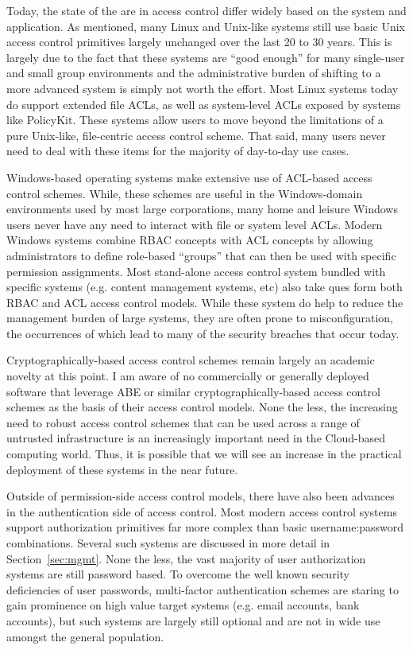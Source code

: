 \documentclass{sig-alternate}
\begin{document}
Today, the state of the are in access control differ widely based on
the system and application. As mentioned, many Linux and Unix-like
systems still use basic Unix access control primitives largely
unchanged over the last 20 to 30 years. This is largely due to the
fact that these systems are ``good enough'' for many single-user and
small group environments and the administrative burden of shifting to
a more advanced system is simply not worth the effort. Most Linux
systems today do support extended file ACLs, as well as system-level
ACLs exposed by systems like PolicyKit. These systems allow users to
move beyond the limitations of a pure Unix-like, file-centric access
control scheme. That said, many users never need to deal with these
items for the majority of day-to-day use cases.

Windows-based operating systems make extensive use of ACL-based access
control schemes. While, these schemes are useful in the Windows-domain
environments used by most large corporations, many home and leisure
Windows users never have any need to interact with file or system
level ACLs. Modern Windows systems combine RBAC concepts with ACL
concepts by allowing administrators to define role-based ``groups''
that can then be used with specific permission assignments. Most
stand-alone access control system bundled with specific systems
(e.g. content management systems, etc) also take ques form both RBAC
and ACL access control models. While these system do help to reduce
the management burden of large systems, they are often prone to
misconfiguration, the occurrences of which lead to many of the
security breaches that occur today.

Cryptographically-based access control schemes remain largely an
academic novelty at this point. I am aware of no commercially or
generally deployed software that leverage ABE or similar
cryptographically-based access control schemes as the basis of their
access control models. None the less, the increasing need to robust
access control schemes that can be used across a range of untrusted
infrastructure is an increasingly important need in the Cloud-based
computing world. Thus, it is possible that we will see an increase in
the practical deployment of these systems in the near future.

Outside of permission-side access control models, there have also been
advances in the authentication side of access control. Most modern
access control systems support authorization primitives far more
complex than basic username:password combinations. Several such
systems are discussed in more detail in Section~\ref{sec:mgmt}. None
the less, the vast majority of user authorization systems are still
password based. To overcome the well known security deficiencies of
user passwords, multi-factor authentication schemes are staring to
gain prominence on high value target systems (e.g. email accounts,
bank accounts), but such systems are largely still optional and are
not in wide use amongst the general population.
\end{document}
